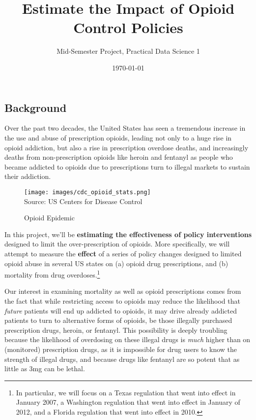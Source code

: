 \documentclass[12pt]{article}
\title{Estimate the Impact of Opioid Control Policies}
\author{Mid-Semester Project, Practical Data Science 1}
\date{\today}
\begin{document}
\maketitle

\subsection*{Background}

Over the past two decades, the United States has seen a tremendous increase in the use and abuse of prescription opioids, leading not only to a huge rise in opioid addiction, but also a rise in prescription overdose deaths, and increasingly deaths from non-prescription opioids like heroin and fentanyl as people who became addicted to opioids due to prescriptions turn to illegal markets to sustain their addiction.

\begin{figure}[h!]
  \centering
  \caption{Opioid Epidemic}\label{}
  \texttt{[image: images/cdc\_opioid\_stats.png]}\\
  \scriptsize{Source: US Centers for Disease Control}
\end{figure}

In this project, we'll be \textbf{estimating the effectiveness of policy interventions} designed to limit the over-prescription of opioids. More specifically, we will attempt to measure the \textbf{effect} of a series of policy changes designed to limited opioid abuse in several US states on (a) opioid drug prescriptions, and (b) mortality from drug overdoses.\footnote{ In particular, we will focus on a Texas regulation that went into effect in January 2007, a Washington regulation that went into effect in January of 2012, and a Florida regulation that went into effect in 2010.}

Our interest in examining mortality as well as opioid prescriptions comes from the fact that while restricting access to opioids may reduce the likelihood that \emph{future} patients will end up addicted to opioids, it may drive already addicted patients to turn to alternative forms of opioids, be those illegally purchased prescription drugs, heroin, or fentanyl. This possibility is deeply troubling because the likelihood of overdosing on these illegal drugs is \emph{much} higher than on (monitored) prescription drugs, as it is impossible for drug users to know the strength of illegal drugs, and because drugs like fentanyl are so potent that as little as 3mg can be lethal.
\end{document}
